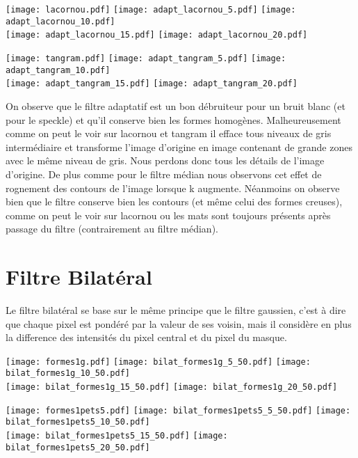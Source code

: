 \documentclass[12pt]{article}
\numberwithin{equation}{section}
\begin{document}
\begin{center}
\texttt{[image: lacornou.pdf]}
\texttt{[image: adapt\_lacornou\_5.pdf]}
\texttt{[image: adapt\_lacornou\_10.pdf]}\\
\texttt{[image: adapt\_lacornou\_15.pdf]}
\texttt{[image: adapt\_lacornou\_20.pdf]}
\end{center}

\begin{center}
\texttt{[image: tangram.pdf]}
\texttt{[image: adapt\_tangram\_5.pdf]}
\texttt{[image: adapt\_tangram\_10.pdf]}\\
\texttt{[image: adapt\_tangram\_15.pdf]}
\texttt{[image: adapt\_tangram\_20.pdf]}
\end{center}

On observe que le filtre adaptatif est un bon débruiteur pour un bruit blanc (et pour le speckle) et qu'il conserve bien les formes homogènes. Malheureusement comme on peut le voir sur lacornou et tangram il efface tous niveaux de gris intermédiaire et transforme l'image d'origine en image contenant de grande zones avec le même niveau de gris. Nous perdons donc tous les détails de l'image d'origine. De plus comme pour le filtre médian nous observons cet effet de rognement des contours de l'image lorsque k augmente. Néanmoins on observe bien que le filtre conserve bien les contours (et même celui des formes creuses), comme on peut le voir sur lacornou ou les mats sont toujours présents après passage du filtre (contrairement au filtre médian).    
\section{Filtre Bilatéral}
Le filtre bilatéral se base sur le même principe que le filtre gaussien, c'est à dire que chaque pixel est pondéré par la valeur de ses voisin, mais il considère en plus la difference des intensités du pixel  central et du pixel du masque. 

\begin{center}
\texttt{[image: formes1g.pdf]}
\texttt{[image: bilat\_formes1g\_5\_50.pdf]}
\texttt{[image: bilat\_formes1g\_10\_50.pdf]}\\
\texttt{[image: bilat\_formes1g\_15\_50.pdf]}
\texttt{[image: bilat\_formes1g\_20\_50.pdf]}
\end{center}

\begin{center}
\texttt{[image: formes1pets5.pdf]}
\texttt{[image: bilat\_formes1pets5\_5\_50.pdf]}
\texttt{[image: bilat\_formes1pets5\_10\_50.pdf]}\\
\texttt{[image: bilat\_formes1pets5\_15\_50.pdf]}
\texttt{[image: bilat\_formes1pets5\_20\_50.pdf]}
\end{center}
\end{document}
